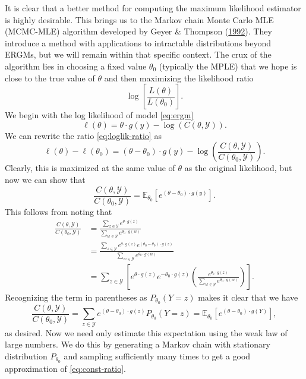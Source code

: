 \documentclass[12pt,twoside]{reedthesis}
\theoremstyle{definition}
\theoremstyle{definition}
\theoremstyle{remark}
\begin{document}
It is clear that a better method for computing the maximum likelihood
estimator is highly desirable. This brings us to the Markov chain Monte
Carlo MLE (MCMC-MLE) algorithm developed by Geyer \& Thompson
(\protect\hyperlink{ref-Geyer1992}{1992}). They introduce a method with
applications to intractable distributions beyond ERGMs, but we will
remain within that specific context. The crux of the algorithm lies in
choosing a fixed value \(\theta_0\) (typically the MPLE) that we hope is
close to the true value of \(\theta\) and then maximizing the likelihood
ratio
\begin{equation}
\log \left[\frac{L(\theta)}{L(\theta_0)} \right].
\label{eq:loglik-ratio}
\end{equation}
We begin with the log likelihood of model \eqref{eq:ergm}
\begin{equation}
\ell(\theta) = \theta \cdot g(y) - \operatorname{log} \left( C(\theta, \mathcal{Y}) \right).
\label{eq:loglik}
\end{equation}
We can rewrite the ratio \eqref{eq:loglik-ratio} as
\begin{equation}
\ell(\theta) - \ell(\theta_{0}) = (\theta - \theta_{0}) \cdot g(y) - \operatorname{log} \left( \frac{C(\theta, \mathcal{Y})}{C(\theta_{0}, \mathcal{Y})} \right).
\label{eq:log-diff}
\end{equation}
Clearly, this is maximized at the same value of \(\theta\) as the
original likelihood, but now we can show that
\begin{equation}
\frac{C(\theta, \mathcal{Y})}{C(\theta_{0}, \mathcal{Y})} = \mathbb{E}_{\theta_0} \left[ e^{(\theta - \theta_0) \cdot g(y)} \right].
\label{eq:const-ratio}
\end{equation}
This follows from noting that
\begin{align*}
  \frac{C(\theta, \mathcal{Y})}{C(\theta_{0}, \mathcal{Y})} &= \frac{\sum_{z \in \mathcal{Y}} e^{\theta \cdot g(z)}}{\sum_{w \in \mathcal{Y}} e^{\theta_{0} \cdot g(w)}} \\
  &= \frac{\sum_{z \in \mathcal{Y}} e^{\theta \cdot g(z)} e^{(\theta_0 - \theta_0) \cdot g(z)}}{\sum_{w \in \mathcal{Y}} e^{\theta_{0} \cdot g(w)}} \\
  &= \sum_{z \in \mathcal{Y}} \left[ e^{\theta \cdot g(z)} e^{-\theta_0 \cdot g(z)} \left( \frac{e^{\theta_0 \cdot g(z)}}{\sum_{w \in \mathcal{Y}} e^{\theta_0 \cdot g(w)}} \right) \right].
\end{align*}
Recognizing the term in parentheses as \(P_{\theta_0} (Y = z)\) makes it
clear that we have \[
\frac{C(\theta, \mathcal{Y})}{C(\theta_{0}, \mathcal{Y})} = \sum_{z \in \mathcal{Y}} e^{(\theta - \theta_0) \cdot g(z)} P_{\theta_0} (Y = z) = \mathbb{E}_{\theta_0}\left[ e^{(\theta - \theta_{0}) \cdot g(Y)} \right],
\] as desired. Now we need only estimate this expectation using the weak
law of large numbers. We do this by generating a Markov chain with
stationary distribution \(P_{\theta_0}\) and sampling sufficiently many
times to get a good approximation of \eqref{eq:const-ratio}.
\end{document}
